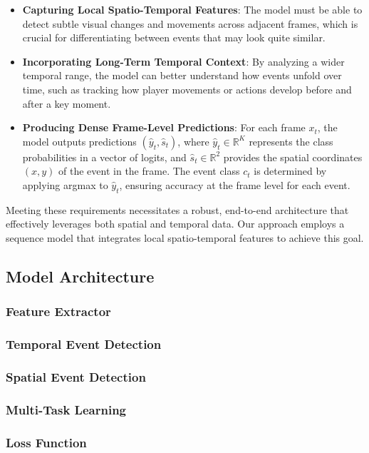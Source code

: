 \documentclass[conference]{IEEEtran}
\begin{document}
\begin{itemize}
    \item \textbf{Capturing Local Spatio-Temporal Features}: The model must be able to detect subtle visual changes and movements across adjacent frames, which is crucial for differentiating between events that may look quite similar.
    \item \textbf{Incorporating Long-Term Temporal Context}: By analyzing a wider temporal range, the model can better understand how events unfold over time, such as tracking how player movements or actions develop before and after a key moment.
    \item \textbf{Producing Dense Frame-Level Predictions}: For each frame \(x_t\), the model outputs predictions \((\hat{y}_t, \hat{s}_t)\), where \(\hat{y}_t \in \mathbb{R}^K\) represents the class probabilities in a vector of logits, and \(\hat{s}_t \in \mathbb{R}^2\) provides the spatial coordinates \((x, y)\) of the event in the frame. The event class \(c_t\) is determined by applying argmax to \(\hat{y}_t\), ensuring accuracy at the frame level for each event.
\end{itemize}

Meeting these requirements necessitates a robust, end-to-end architecture that effectively leverages both spatial and temporal data. Our approach employs a sequence model that integrates local spatio-temporal features to achieve this goal.


\subsection{Model Architecture}
\subsubsection{Feature Extractor}
\subsubsection{Temporal Event Detection}
\subsubsection{Spatial Event Detection}
\subsubsection{Multi-Task Learning}
\subsubsection{Loss Function}
\end{document}
